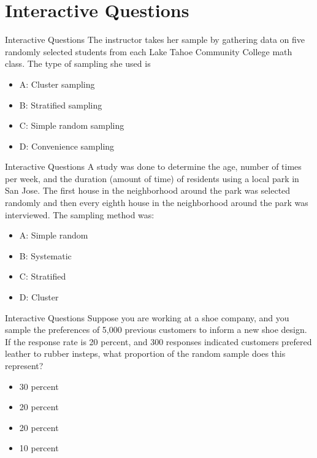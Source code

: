 \documentclass{beamer}
\begin{document}
\section{Interactive Questions}

\begin{frame}{Interactive Questions}
The instructor takes her sample by gathering data on five randomly selected students from each Lake Tahoe Community College math class. The type of sampling she used is
\begin{itemize}
\item A: Cluster sampling
\item B: Stratified sampling
\item C: Simple random sampling
\item D: Convenience sampling
\end{itemize}
\end{frame}

\begin{frame}{Interactive Questions}
A study was done to determine the age, number of times per week, and the duration (amount of time) of residents using
a local park in San Jose. The first house in the neighborhood around the park was selected randomly and then every eighth
house in the neighborhood around the park was interviewed. The sampling method was:
\begin{itemize}
\item A: Simple random
\item B: Systematic
\item C: Stratified
\item D: Cluster
\end{itemize}
\end{frame}

\begin{frame}{Interactive Questions}
Suppose you are working at a shoe company, and you sample the preferences of 5,000 previous customers to inform a new shoe design.  If the response rate is 20 percent, and 300 responses indicated customers prefered leather to rubber insteps, what proportion of the random sample does this represent?
\begin{itemize}
\item 30 percent
\item 20 percent
\item 20 percent
\item 10 percent
\end{itemize}

\end{frame}
\end{document}
